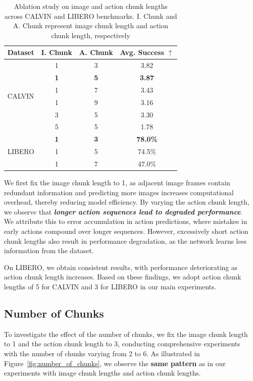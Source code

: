 \begin{table}[h]
\centering
\begin{tabular}{lccc}
\toprule
Dataset & I. Chunk & A. Chunk & Avg. Success $\uparrow$ \\
\midrule
\multirow{6}{*}{CALVIN} & 1 & 3 & 3.82 \\
& \textbf{1} & \textbf{5} & \textbf{3.87} \\
& 1 & 7 & 3.43 \\
& 1 & 9 & 3.16 \\
& 3 & 5 & 3.30 \\
& 5 & 5 & 1.78 \\
\midrule
\multirow{3}{*}{LIBERO} & \textbf{1} & \textbf{3} & \textbf{78.0\%} \\
& 1 & 5 & 74.5\% \\
& 1 & 7 & 47.0\% \\
\bottomrule
\end{tabular}
\caption{Ablation study on image and action chunk lengths across CALVIN and LIBERO benchmarks. I. Chunk and A. Chunk represent image chunk length and action chunk length, respectively}
\label{tab:chunk_ablation}
\end{table}

We first fix the image chunk length to 1, as adjacent image frames contain redundant information and predicting more images increases computational overhead, thereby reducing model efficiency. By varying the action chunk length, we observe that
\textbf{\textit{longer action sequences lead to degraded performance}}. We attribute this to error accumulation in action predictions, where mistakes in early actions compound over longer sequences. However, excessively short action chunk lengths also result in performance degradation, as the network learns less information from the dataset. 

On LIBERO, we obtain consistent results, with performance deteriorating as action chunk length increases. Based on these findings, we adopt action chunk lengths of 5 for CALVIN and 3 for LIBERO in our main experiments.

\subsection{Number of Chunks} 

To investigate the effect of the number of chunks, we fix the image chunk length to 1 and the action chunk length to 3, conducting comprehensive experiments with the number of chunks varying from 2 to 6. As illustrated in Figure~\ref{fig:number_of_chunks}, we observe the \textbf{same pattern} as in our experiments with image chunk lengths and action chunk lengths.

